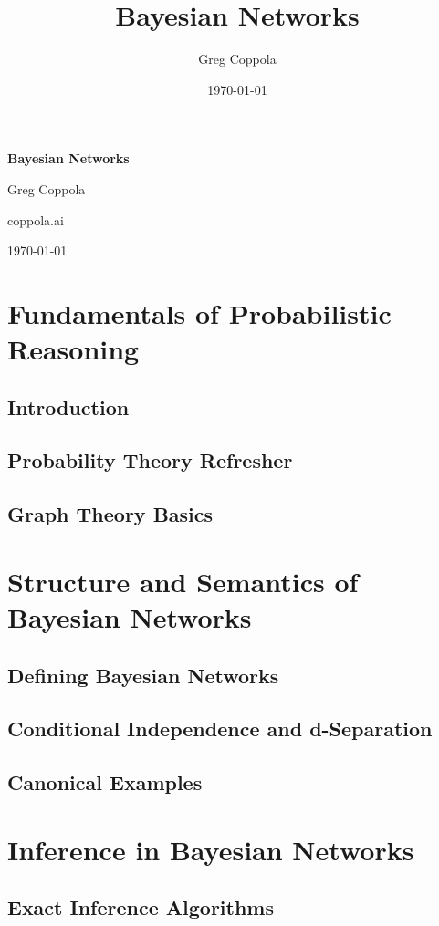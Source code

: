 \documentclass[12pt]{book}
\title{Bayesian Networks}
\author{Greg Coppola}
\date{\today}
\newcommand{\publisher}{coppola.ai}
\begin{document}
\begin{titlepage}
    \centering
    {\Huge \bfseries Bayesian Networks \par}
    \vspace{1.5cm}
    {\Large Greg Coppola \par}
    \vspace{2cm}
    {\large \publisher \par}
    \vfill
    {\large \today \par}
\end{titlepage}

\frontmatter
\tableofcontents

\mainmatter

\part{Fundamentals of Probabilistic Reasoning}
\chapter{Introduction}
\chapter{Probability Theory Refresher}
\chapter{Graph Theory Basics}

\part{Structure and Semantics of Bayesian Networks}
\chapter{Defining Bayesian Networks}
\chapter{Conditional Independence and d-Separation}
\chapter{Canonical Examples}

\part{Inference in Bayesian Networks}
\chapter{Exact Inference Algorithms}
\end{document}
